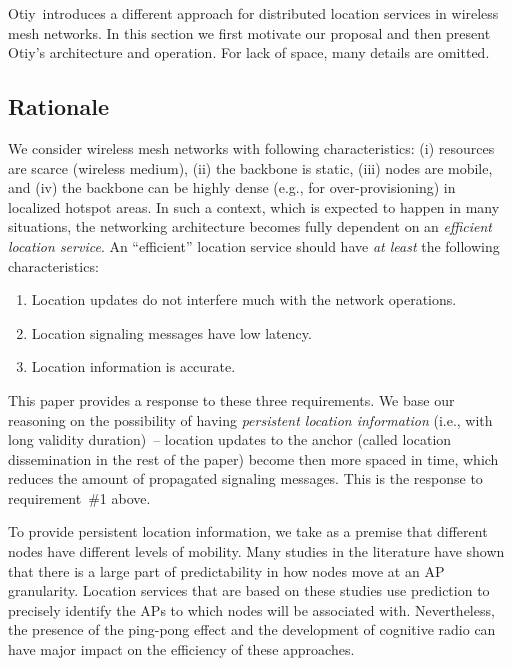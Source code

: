 \documentclass[a4paper]{sig-alternate-10pt}
\newcommand{\otiy}{{\sffamily Otiy}}
\begin{document}
\otiy\ introduces a different approach for distributed location
services in wireless mesh networks. In this section we first
motivate our proposal and then present \otiy's architecture and
operation. For lack of space, many details are omitted.


\subsection{Rationale}
\label{subsec:rationale}

We consider wireless mesh networks with following characteristics:
(i) resources are scarce (wireless me\-dium), (ii) the backbone is
static, (iii) nodes are mobile, and (iv) the backbone can be highly
dense (e.g., for over-provisioning) in localized hotspot areas. In
such a context, which is expected to happen in many situations, the
networking architecture becomes fully dependent on an {\it efficient
location service}. An ``efficient'' location service should have
{\it at least} the following characteristics:

\begin{enumerate}

\item Location updates do not interfere much with 
the network operations.

\item Location signaling messages have low latency.

\item Location information is accurate.

\end{enumerate}

This paper provides a response to these three requirements. We base
our reasoning on the possibility of having {\it persistent location
information} (i.e., with long validity duration)~-- location updates
to the anchor (called location dissemination in the rest of the paper) 
become then more spaced in time, which reduces the amount of propagated 
signaling messages. This is the response to requirement~\#1 above.

To provide persistent location information, we take as a premise
that different nodes have different levels of mobility. Many studies
in the literature have shown that there is a large part of
predictability in how nodes move at an
AP~\cite{francois,song_predict,franc_predict} granularity. Location
services that are based on these studies use prediction to precisely
identify the APs to which nodes will be associated with.
Nevertheless, the presence of the ping-pong effect and the
development of cognitive radio can have major impact on the
efficiency of these approaches.
\end{document}
